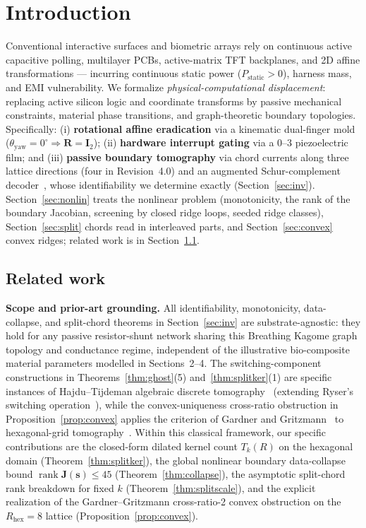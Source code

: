 \documentclass[11pt,a4paper]{article}
\theoremstyle{definition}
\theoremstyle{remark}
\begin{document}
\section{Introduction}

Conventional interactive surfaces and biometric arrays rely on continuous active capacitive polling, multilayer PCBs, active-matrix TFT backplanes, and 2D affine transformations --- incurring continuous static power ($P_{\text{static}} > 0$), harness mass, and EMI vulnerability. We formalize \textit{physical-computational displacement}: replacing active silicon logic and coordinate transforms by passive mechanical constraints, material phase transitions, and graph-theoretic boundary topologies. Specifically: (i) \textbf{rotational affine eradication} via a kinematic dual-finger mold ($\theta_{\text{yaw}} = 0^\circ \Rightarrow \mathbf{R} = \mathbf{I}_2$); (ii) \textbf{hardware interrupt gating} via a $0$--$3$ piezoelectric film; and (iii) \textbf{passive boundary tomography} via chord currents along three lattice directions (four in Revision~4.0) and an augmented Schur-complement decoder~\cite{calderon1980,schur1917}, whose identifiability we determine exactly (Section~\ref{sec:inv}). Section~\ref{sec:nonlin} treats the nonlinear problem (monotonicity, the rank of the boundary Jacobian, screening by closed ridge loops, seeded ridge classes), Section~\ref{sec:split} chords read in interleaved parts, and Section~\ref{sec:convex} convex ridges; related work is in Section~\ref{sec:related}.

\subsection{Related work}\label{sec:related}
\noindent\textbf{Scope and prior-art grounding.} All identifiability, monotonicity, data-collapse, and split-chord theorems in Section~\ref{sec:inv} are substrate-agnostic: they hold for any passive resistor-shunt network sharing this Breathing Kagome graph topology and conductance regime, independent of the illustrative bio-composite material parameters modelled in Sections~2--4. The switching-component constructions in Theorems~\ref{thm:ghost}(5) and~\ref{thm:splitker}(1) are specific instances of Hajdu--Tijdeman algebraic discrete tomography~\cite{hajdu2001} (extending Ryser's switching operation~\cite{ryser1957}), while the convex-uniqueness cross-ratio obstruction in Proposition~\ref{prop:convex} applies the criterion of Gardner and Gritzmann~\cite{gardner1997} to hexagonal-grid tomography~\cite{matej1998,nagy2016}. Within this classical framework, our specific contributions are the closed-form dilated kernel count $T_k(R)$ on the hexagonal domain (Theorem~\ref{thm:splitker}), the global nonlinear boundary data-collapse bound $\operatorname{rank}\mathbf{J}(\mathbf{s})\le 45$ (Theorem~\ref{thm:collapse}), the asymptotic split-chord rank breakdown for fixed $k$ (Theorem~\ref{thm:splitscale}), and the explicit realization of the Gardner--Gritzmann cross-ratio-2 convex obstruction on the $R_{\text{hex}}=8$ lattice (Proposition~\ref{prop:convex}).
\end{document}
